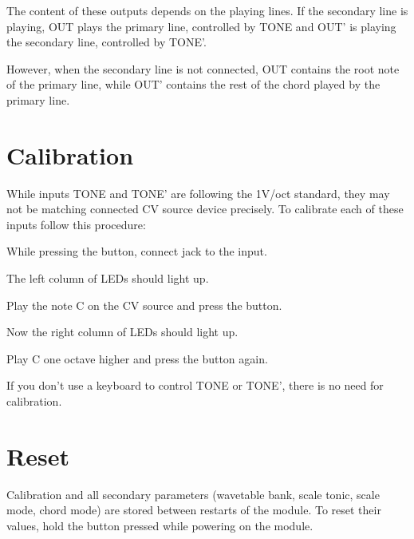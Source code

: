 \documentclass[10pt,nofoldmark,nocombine]{leaflet} %
\newenvironment{packed_enumerate}{
\begin{enumerate}
  \setlength{\itemsep}{1pt}
  \setlength{\parskip}{0pt}
  \setlength{\parsep}{0pt}
}{\end{enumerate}}
\begin{document}
The content of these outputs depends on the playing lines. If the secondary line is playing, OUT plays the primary line, controlled by TONE and OUT' is playing the secondary line, controlled by TONE'.

However, when the secondary line is not connected, OUT contains the root note of the primary line, while OUT' contains the rest of the chord played by the primary line.

\section{Calibration}


While inputs TONE and TONE' are following the 1V/oct standard, they may not be matching connected CV source device precisely. To calibrate each of these inputs follow this procedure:

\begin{packed_enumerate}
  \item While pressing the button, connect jack to the input.
  \item The left column of LEDs should light up.
  \item Play the note C on the CV source and press the button.
  \item Now the right column of LEDs should light up.
  \item Play C one octave higher and press the button again.
\end{packed_enumerate}

If you don't use a keyboard to control TONE or TONE', there is no need for calibration.

\section{Reset}

Calibration and all secondary parameters (wavetable bank, scale tonic, scale mode, chord mode) are stored between restarts of the module. To reset their values, hold the button pressed while powering on the module.
\end{document}
